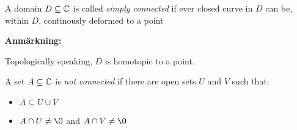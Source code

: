 \par\bigskip
\begin{theo}{}
  A domain $D\subseteq\mathbb{C}$ is called \textit{simply connected} if ever closed curve in $D$ can be, within $D$, continously deformed to a point 
\end{theo}
\par\bigskip
\noindent\textbf{Anmärkning:}\par
\noindent Topologically speaking, $D$ is homotopic to a point. 
\par\bigskip
\begin{theo}{}
  A set $A\subseteq\mathbb{C}$ is \textit{not connected} if there are open sets $U$ and $V$ such that:\par
  \begin{itemize}
    \item $A\subseteq U\cup V$
    \item $A\cap U\neq\O$ and $A\cap V\neq\O$
  \end{itemize}
\end{theo}
\newpage
